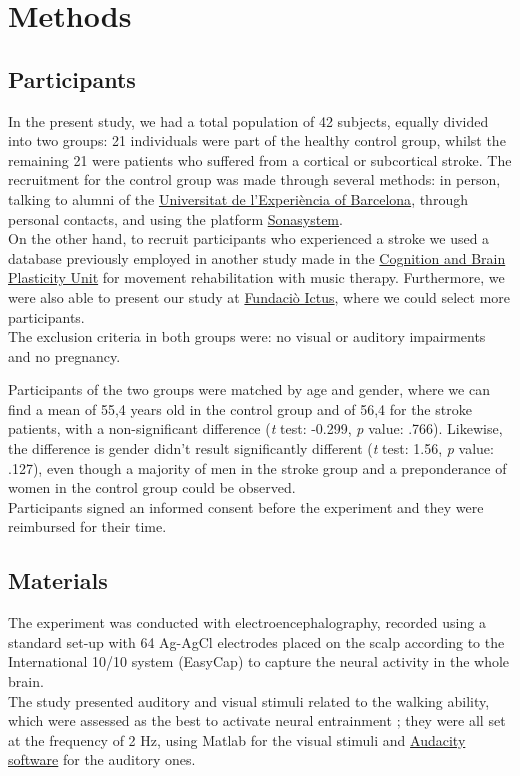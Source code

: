 \chapter{Methods}
\section{Participants}
In the present study, we had a total population of 42 subjects, equally divided into two groups: 21 individuals were part of the healthy control group, whilst the remaining 21 were patients who suffered from a cortical or subcortical stroke. The recruitment for the control group was made through several methods: in person, talking to alumni of the \href{https://www.experiencia.ub.edu/ca/}{Universitat de l'Experiència of Barcelona}, through personal contacts, and using the platform \href{https://www.sona-systems.com/}{Sonasystem}. \\
On the other hand, to recruit participants who experienced a stroke we used a database previously employed in another study made in the \href{https://brainvitge.org/}{Cognition and Brain Plasticity Unit} for movement rehabilitation with music therapy. Furthermore, we were also able to present our study at \href{https://www.fundacioictus.com/}{Fundaciò Ictus}, where we could select more participants. \\ 
The exclusion criteria in both groups were: no visual or auditory impairments and no pregnancy.

Participants of the two groups were matched by age and gender, where we can find a mean of 55,4 years old in the control group and of 56,4 for the stroke patients, with a non-significant difference (\textit{t} test: -0.299, \textit{p} value: .766). 
Likewise, the difference is gender didn't result significantly different (\textit{t} test: 1.56, \textit{p} value: .127), even though a majority of men in the stroke group and a preponderance of women in the control group could be observed. \\
Participants signed an informed consent before the experiment and they were reimbursed for their time. 

\section{Materials}
The experiment was conducted with electroencephalography, recorded using a standard set-up with 64 Ag-AgCl electrodes placed on the scalp according to the International 10/10 system (EasyCap) to capture the neural activity in the whole brain. \\
The study presented auditory and visual stimuli related to the walking ability, which were assessed as the best to activate neural entrainment \parencite{Cracco_2022}; they were all set at the frequency of 2 Hz, using Matlab for the visual stimuli and \href{https://www.audacityteam.org/}{Audacity software} for the auditory ones.

